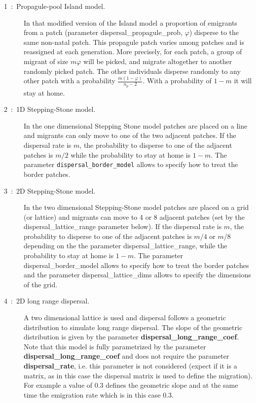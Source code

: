 \documentclass[letterpaper,12pt,oneside]{book}
\begin{document}
\begin{description}
\begin{description}
\item[1~:~Propagule-pool Island model.] In that modified version of the Island model a proportion of emigrants from a patch (parameter \textsf{dispersal\_propagule\_prob}, $\varphi$) disperse to the same non-natal patch.  This propagule patch varies among patches and is reassigned at each generation. More precisely, for each patch, a group of migrant of size $m\varphi$ will be picked, and migrate altogether to another randomly picked patch. The other individuals disperse randomly to any other patch with a probability $\frac{m(1-\varphi)}{n_{p}-2}$. With a probability of $1-m$ it will stay at home.

\item[2~:~1D Stepping-Stone model.] In the one dimensional Stepping Stone model patches are placed on a line and migrants can only move to one of the two adjacent patches. If the dispersal rate is $m$, the probability to disperse to one of the adjacent patches is $m/2$ while the probability to stay at home is $1-m$. The parameter \texttt{dispersal\_border\_model} allows to specify how to treat the border patches.   

\item[3~:~2D Stepping-Stone model.] In the two dimensional Stepping-Stone model patches are placed on a grid (or lattice) and migrants can move to 4 or 8 adjacent patches (set by the \textsf{dispersal\_lattice\_range} parameter below). If the dispersal rate is $m$, the probability to disperse to one of the adjacent patches is $m/4$ or $m/8$ depending on the the parameter \textsf{dispersal\_lattice\_range}, while the probability to stay at home is $1-m$. The parameter \textsf{dispersal\_border\_model} allows to specify how to treat the border patches and the parameter \textsf{dispersal\_lattice\_dims} allows to specify the dimensions of the grid.   

\item[4~:~2D long range dispersal.] A two dimensional lattice is used and dispersal follows a geometric distribution to simulate long range dispersal. The slope of the geometric distribution is given by the parameter \textbf{dispersal\_long\_range\_coef}. Note that this model is fully parametrized by the parameter \textbf{dispersal\_long\_range\_coef} and does not require the parameter \textbf{dispersal\_rate}, i.e. this parameter is not considered (expect if it is a matrix, as in this case the dispersal matrix is used to define the migration). For example a value of 0.3 defines the geometric slope and at the same time the emigration rate which is in this case 0.3.
\end{description}


\end{description}
\end{document}
